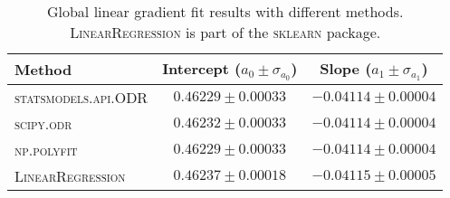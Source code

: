 
\begin{table}
\caption{Global linear gradient fit results with different methods. \textsc{LinearRegression} is part of the \textsc{sklearn} package.}
\label{tab:global_fit_results_per_method}
\begin{tabularx}{\columnwidth}{lCC}
\hline
Method & Intercept ($a_0 \pm \sigma_{a_0}$) & Slope ($a_1 \pm \sigma_{a_1}$) \\
\hline
\textsc{statsmodels.api.ODR} & $0.46229 \pm 0.00033$ & $-0.04114 \pm 0.00004$ \\
\textsc{scipy.odr} & $0.46232 \pm 0.00033$ & $-0.04114 \pm 0.00004$ \\
\textsc{np.polyfit} & $0.46229 \pm 0.00033$ & $-0.04114 \pm 0.00004$ \\
\textsc{LinearRegression} & $0.46237 \pm 0.00018$ & $-0.04115 \pm 0.00005$ \\
\hline
\end{tabularx}
\end{table}
